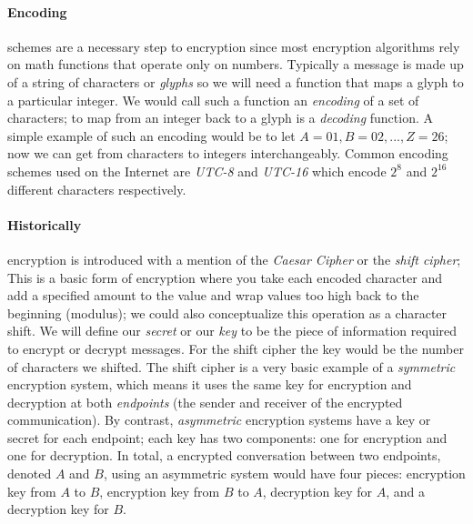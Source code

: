 \documentclass[12pt]{article}
\theoremstyle{remark}
\begin{document}
\paragraph{Encoding} schemes are a necessary step to encryption since most encryption algorithms rely on math functions that operate only on numbers.  Typically a message is made up of a string of characters or \textit{glyphs} so we will need a function that maps a glyph to a particular integer.  We would call such a function an \textit{encoding} of a set of characters; to map from an integer back to a glyph is a \textit{decoding} function.  A simple example of such an encoding would be to let $A=01,B=02,...,Z=26$; now we can get from characters to integers interchangeably.  Common encoding schemes used on the Internet are \textit{UTC-8} and \textit{UTC-16} which encode $2^8$ and $2^{16}$ different characters respectively.

\paragraph{Historically} encryption is introduced with a mention of the \textit{Caesar Cipher} or the \textit{shift cipher}; This is a basic form of encryption where you take each encoded character and add a specified amount to the value and wrap values too high back to the beginning (modulus); we could also conceptualize this operation as a character shift.  We will define our \textit{secret} or our \textit{key} to be the piece of information required to encrypt or decrypt messages.  For the shift cipher the key would be the number of characters we shifted.  The shift cipher is a very basic example of a \textit{symmetric} encryption system, which means it uses the same key for encryption and decryption at both \textit{endpoints} (the sender and receiver of the encrypted communication).  By contrast, \textit{asymmetric} encryption systems have a key or secret for each endpoint; each key has two components: one for encryption and one for decryption.  In total, a encrypted conversation between two endpoints, denoted $A$ and $B$, using an asymmetric system would have four pieces: encryption key from $A$ to $B$, encryption key from $B$ to $A$, decryption key for $A$, and a decryption key for $B$.
\end{document}
